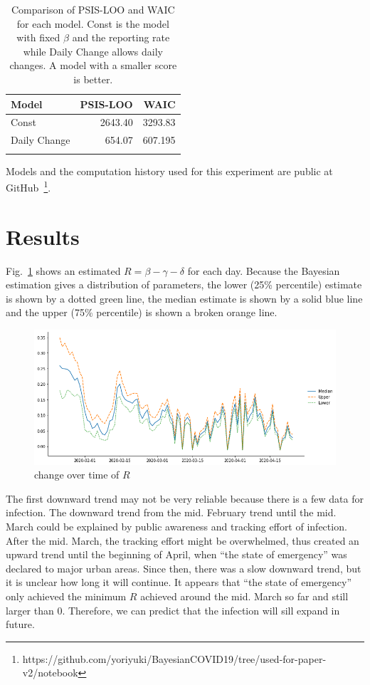 \documentclass{amsart}
\begin{document}
\begin{table}[h]
\begin{center}
\begin{tabular}{lrr} \toprule
Model & PSIS-LOO & WAIC \\ \midrule 
Const & 2643.40 &  3293.83 \\ 
Daily Change & 654.07 & 607.195 \\
\bottomrule\\
\end{tabular}
\caption{Comparison of PSIS-LOO and WAIC for each model.  Const is the model with fixed $\beta$ and the reporting rate while Daily Change allows daily changes.  A model with a smaller score is better.}
\label{tbl:IC}
\end{center}
\end{table}

Models and the computation history used for this experiment are public at GitHub~\footnote{https://github.com/yoriyuki/BayesianCOVID19/tree/used-for-paper-v2/notebook}.

\section{Results}

Fig.~\ref{fig:b} shows an estimated $R = \beta - \gamma - \delta$ for each day.
Because the Bayesian estimation gives a distribution of parameters, the lower (25\% percentile) estimate is shown by a dotted green line, the median estimate is shown by a solid blue line and the upper (75\% percentile) is shown a broken orange line.
\begin{figure}[h]
 \centering
 \includegraphics[width=\linewidth]{fig/beta-Japan.png}
 \caption{ change over time of $R$}
 \label{fig:b}
\end{figure}
The first downward trend may not be very reliable because there is a few data for infection.
The downward trend from the mid. February trend until the mid. March could be explained by public awareness and tracking effort of infection.
After the mid. March, the tracking effort might be overwhelmed, thus created an upward trend until the beginning of April, when ``the state of emergency'' was declared to major urban areas.
Since then, there was a slow downward trend, but it is unclear how long it will continue.
It appears that ``the state of emergency'' only achieved the minimum $R$ achieved around the mid. March so far and still larger than 0.
Therefore, we can predict that the infection will sill expand in future.
\end{document}
